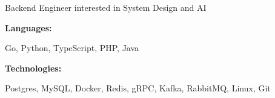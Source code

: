 \documentclass[9pt]{developercv} %
\begin{document}
\begin{minipage}[t]{0.5\textwidth}
	\vspace{-6pt}
	Backend Engineer interested in System Design and AI
	\vspace{-6pt}
\end{minipage}
\hfill %
\begin{minipage}[t]{0.465\textwidth}
	\vspace{-6pt}

	\begin{minipage}[t]{0.2\textwidth}
		\textbf{Languages:}
	\end{minipage}
	\hfill
	\begin{minipage}[t]{0.73\textwidth}
		Go, Python, TypeScript, PHP, Java
	\end{minipage}
	\vspace{4mm}

	\begin{minipage}[t]{0.2\textwidth}
		\textbf{Technologies:}
	\end{minipage}
	\hfill
	\begin{minipage}[t]{0.73\textwidth}
		Postgres, MySQL, Docker, Redis, gRPC, Kafka, RabbitMQ, Linux, Git
	\end{minipage}

\end{minipage}
\end{document}
